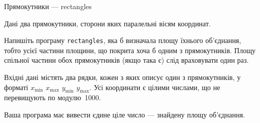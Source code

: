 \begin{problemAllDefault}{Прямокутники --- rectangles}

Дані два прямокутники, сторони яких паралельні вісям координат.

\Task Напишіть програму \texttt{rectangles}, яка б визначала площу їхнього об’єднання, тобто усієї частини площини, що покрита хоча б одним з прямокутників. Площу спільної частини обох прямокутників (якщо така є) слід враховувати один раз.

\InputFile Вхідні дані містять два рядки, кожен з яких описує один з прямокутників, у форматі $x_{\min}$ $x_{\max}$ $y_{\min}$ $y_{\max}$. Усі координати є цілими числами, що не перевищують по модулю~1000.

\OutputFile Ваша програма має вивести єдине ціле число --- знайдену площу об’єднання.




\end{problemAllDefault}
